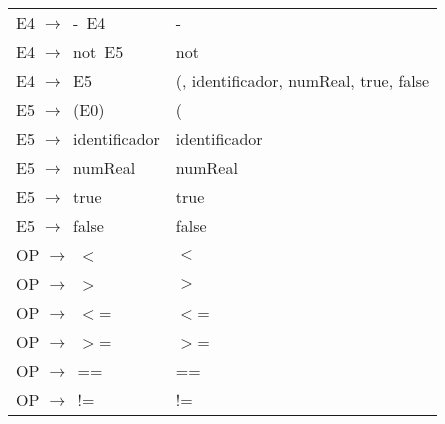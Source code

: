 \begin{tabular}{ |p{5cm}||p{8cm}| }
 E4  $\longrightarrow$\ -\ E4\ & - \\
 E4  $\longrightarrow$\ not\ E5\ & not \\
 E4  $\longrightarrow$\ E5\ & (, identificador, numReal, true, false \\
 E5  $\longrightarrow$\ (E0) & ( \\
 E5  $\longrightarrow$\ identificador & identificador \\
 E5  $\longrightarrow$\ numReal & numReal \\
 E5  $\longrightarrow$\ true & true \\
 E5  $\longrightarrow$\ false & false \\
 OP  $\longrightarrow$\ $<$ & $<$ \\
 OP  $\longrightarrow$\ $>$ & $>$ \\
 OP  $\longrightarrow$\ $<$= & $<$= \\
 OP  $\longrightarrow$\ $>$= & $>$= \\
 OP  $\longrightarrow$\ == & == \\
 OP  $\longrightarrow$\ != & != \\
 \hline
\end{tabular}
